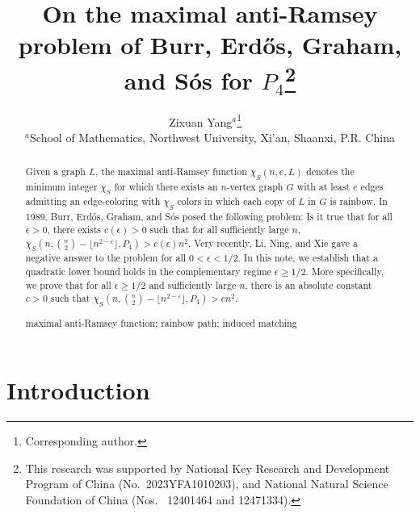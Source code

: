 \documentclass[11pt,a4paper]{article}
\newcommand{\chiS}{\chi_S}
\begin{document}
\title{\bf\Large On the maximal anti-Ramsey problem of Burr, Erd\H{o}s, Graham, and S\'{o}s for $P_4$\thanks{This research was supported by National Key Research and Development Program of China (No.~2023YFA1010203), and National Natural Science Foundation of China (Nos. ~12401464 and 12471334).}
}
\date{}
\author{Zixuan Yang$^{a}$\thanks{Corresponding author.}
~\\[2mm]
\small $^{a}$School of Mathematics,  Northwest University, Xi'an, Shaanxi, P.R. China\\}
\maketitle

\begin{abstract}
Given a graph $L$, the maximal anti-Ramsey function $\chiS(n,e,L)$ denotes the minimum integer $\chiS$ for which there exists an $n$-vertex graph $G$ with at least $e$ edges admitting an edge-coloring with $\chiS$ colors in which each copy of $L$ in $G$ is rainbow.
In 1989, Burr, Erd\H{o}s, Graham, and S\'{o}s  posed the following problem:
Is it true that for all $\epsilon>0$, there exists $c(\epsilon)>0$ such that for all sufficiently large $n$,
$
\chiS\left(n,\binom{n}{2}-\lfloor n^{2-\epsilon}\rfloor,P_4\right)>c(\epsilon)n^2.
$
Very recently, Li, Ning, and Xie  gave a negative answer to the  problem for all $0< \epsilon< 1/2$.
In this note, we establish that a quadratic lower bound holds in the complementary regime $ \epsilon\geq 1/2$.
More specifically, we prove that for all $\epsilon\ge 1/2$ and sufficiently large $n$, there is an absolute constant $c>0$ such that
$
\chiS\left(n,\binom{n}{2}-\lfloor n^{2-\epsilon}\rfloor,P_4\right)>c n^2.
$



\medskip
{} maximal anti-Ramsey function; rainbow path; induced matching
\medskip

\smallskip
\end{abstract}


\setcounter{footnote}{0}
\renewcommand{\thefootnote}{}

\section{Introduction}
\end{document}
